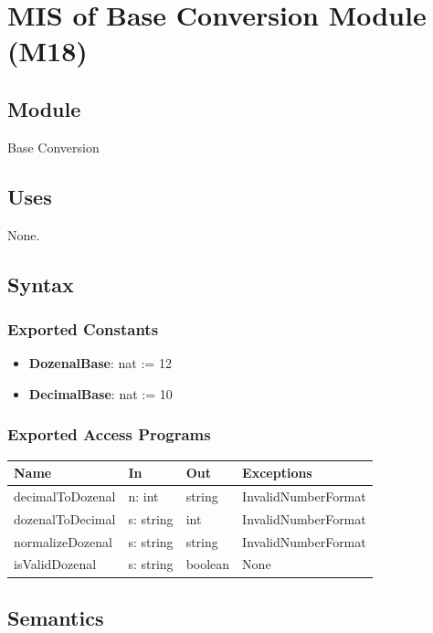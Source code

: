 \documentclass[12pt, titlepage]{article}
\begin{document}
\newpage
\section{MIS of Base Conversion Module (M18)}\label{sec:base-conversion-module}

\subsection{Module}
Base Conversion

\subsection{Uses}
None.

\subsection{Syntax}

\subsubsection{Exported Constants}
\begin{itemize}
    \item \textbf{DozenalBase}: nat := 12
    \item \textbf{DecimalBase}: nat := 10
\end{itemize}

\subsubsection{Exported Access Programs}

\begin{center}
\begin{tabular}{p{4.5cm} p{4.5cm} p{3.5cm} p{3.5cm}}
\toprule
\textbf{Name} & \textbf{In} & \textbf{Out} & \textbf{Exceptions} \\
\midrule
decimalToDozenal & n: int & string & InvalidNumberFormat \\
dozenalToDecimal & s: string & int & InvalidNumberFormat \\
normalizeDozenal & s: string & string & InvalidNumberFormat \\
isValidDozenal & s: string & boolean & None \\
\bottomrule
\end{tabular}
\end{center}

\subsection{Semantics}
\end{document}
